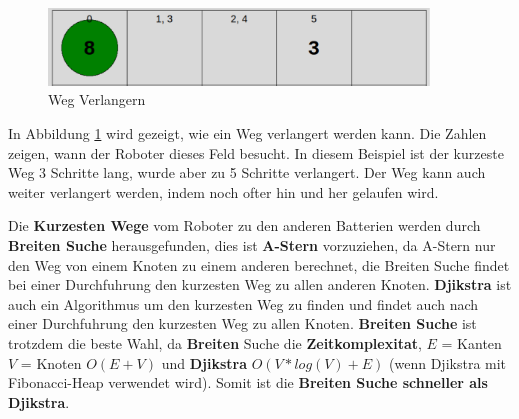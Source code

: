 \documentclass[a4paper,12pt,arial]{scrartcl}
\begin{document}
\begin{figure}[h]
    \centering
    \includegraphics[width=0.9\textwidth]{weg_verlaengern_n.pdf}
    \caption{Weg Verlangern}
    \label{fig:weg_verlangern}
\end{figure}
In Abbildung \ref{fig:weg_verlangern} wird gezeigt, wie ein Weg verlangert werden kann. Die Zahlen zeigen, wann der Roboter dieses Feld besucht. In diesem Beispiel ist der kurzeste Weg 3 Schritte lang, wurde aber zu 5 Schritte verlangert. Der Weg kann auch weiter verlangert werden, indem noch ofter hin und her gelaufen wird.

\par
Die \textbf{Kurzesten Wege} vom Roboter zu den anderen Batterien werden durch \textbf{Breiten Suche} \cite{cormen} herausgefunden, dies ist \textbf{A-Stern} \cite{hart} vorzuziehen, da A-Stern nur den Weg von einem Knoten zu einem anderen berechnet, die Breiten Suche findet bei einer Durchfuhrung den kurzesten Weg zu allen anderen Knoten. \textbf{Djikstra} \cite{dijkstra} ist auch ein Algorithmus um den kurzesten Weg zu finden und findet auch nach einer Durchfuhrung den kurzesten Weg zu allen Knoten. \textbf{Breiten Suche} ist trotzdem die beste Wahl, da \textbf{Breiten} Suche die \textbf{Zeitkomplexitat}, $E$ = Kanten $V$ = Knoten $O(E + V)$ und \textbf{Djikstra} $O(V * log(V) + E)$ (wenn Djikstra mit Fibonacci-Heap verwendet wird). Somit ist die \textbf{Breiten Suche schneller als Djikstra}.
\end{document}
